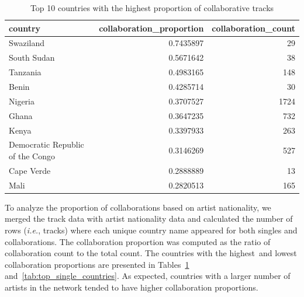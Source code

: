 \documentclass{article}
\begin{document}
\begin{table}[H]
    \centering
    \begin{tabular}[t]{lrr}
        \toprule
        country                          & collaboration\_proportion & collaboration\_count \\
        \midrule
        Swaziland                        & 0.7435897                 & 29                   \\
        South Sudan                      & 0.5671642                 & 38                   \\
        Tanzania                         & 0.4983165                 & 148                  \\
        Benin                            & 0.4285714                 & 30                   \\
        Nigeria                          & 0.3707527                 & 1724                 \\
        Ghana                            & 0.3647235                 & 732                  \\
        Kenya                            & 0.3397933                 & 263                  \\
        Democratic Republic of the Congo & 0.3146269                 & 527                  \\
        Cape Verde                       & 0.2888889                 & 13                   \\
        Mali                             & 0.2820513                 & 165                  \\
        \bottomrule
    \end{tabular}
    \caption{Top 10 countries with the highest proportion of collaborative tracks}\label{tab:top_collab_countries}
\end{table}

To analyze the proportion of collaborations based on artist nationality, we
merged the track data with artist nationality data and calculated the number of
rows (\textit{i.e.}, tracks) where each unique country name appeared for both
singles and collaborations. The collaboration proportion was computed as the
ratio of collaboration count to the total count. The countries with the highest\
and lowest collaboration proportions are presented in Tables\
\ref{tab:top_collab_countries} and\ \ref{tab:top_single_countries}. As
expected, countries with a larger number of artists in the network tended to
have higher collaboration proportions.
\end{document}
